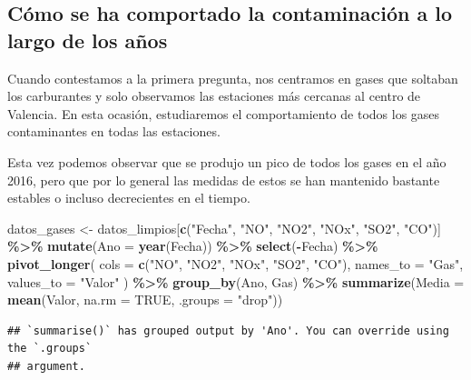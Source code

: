 \documentclass[notspecified,article,submit,moreauthors,pdftex]{Definitions/mdpi}
\newenvironment{Shaded}{\begin{snugshade}}{\end{snugshade}}
\newcommand{\AttributeTok}[1]{\textcolor[rgb]{0.13,0.29,0.53}{#1}}
\newcommand{\ConstantTok}[1]{\textcolor[rgb]{0.56,0.35,0.01}{#1}}
\newcommand{\FunctionTok}[1]{\textcolor[rgb]{0.13,0.29,0.53}{\textbf{#1}}}
\newcommand{\NormalTok}[1]{#1}
\newcommand{\OtherTok}[1]{\textcolor[rgb]{0.56,0.35,0.01}{#1}}
\newcommand{\SpecialCharTok}[1]{\textcolor[rgb]{0.81,0.36,0.00}{\textbf{#1}}}
\newcommand{\StringTok}[1]{\textcolor[rgb]{0.31,0.60,0.02}{#1}}
\begin{document}
\hypertarget{cuxf3mo-se-ha-comportado-la-contaminaciuxf3n-a-lo-largo-de-los-auxf1os}{%
\subsection{Cómo se ha comportado la contaminación a lo largo de los
años}\label{cuxf3mo-se-ha-comportado-la-contaminaciuxf3n-a-lo-largo-de-los-auxf1os}}

Cuando contestamos a la primera pregunta, nos centramos en gases que
soltaban los carburantes y solo observamos las estaciones más cercanas
al centro de Valencia. En esta ocasión, estudiaremos el comportamiento
de todos los gases contaminantes en todas las estaciones.

Esta vez podemos observar que se produjo un pico de todos los gases en
el año 2016, pero que por lo general las medidas de estos se han
mantenido bastante estables o incluso decrecientes en el tiempo.

\begin{Shaded}
\begin{Highlighting}[]
\NormalTok{datos\_gases }\OtherTok{\textless{}{-}}
\NormalTok{  datos\_limpios[}\FunctionTok{c}\NormalTok{(}\StringTok{"Fecha"}\NormalTok{, }\StringTok{"NO"}\NormalTok{, }\StringTok{"NO2"}\NormalTok{, }\StringTok{"NOx"}\NormalTok{, }\StringTok{"SO2"}\NormalTok{, }\StringTok{"CO"}\NormalTok{)] }\SpecialCharTok{\%\textgreater{}\%}
  \FunctionTok{mutate}\NormalTok{(}\AttributeTok{Ano =} \FunctionTok{year}\NormalTok{(Fecha)) }\SpecialCharTok{\%\textgreater{}\%}
  \FunctionTok{select}\NormalTok{(}\SpecialCharTok{{-}}\NormalTok{Fecha) }\SpecialCharTok{\%\textgreater{}\%}
  \FunctionTok{pivot\_longer}\NormalTok{(}
    \AttributeTok{cols =} \FunctionTok{c}\NormalTok{(}\StringTok{"NO"}\NormalTok{, }\StringTok{"NO2"}\NormalTok{, }\StringTok{"NOx"}\NormalTok{, }\StringTok{"SO2"}\NormalTok{, }\StringTok{"CO"}\NormalTok{),}
    \AttributeTok{names\_to =} \StringTok{"Gas"}\NormalTok{,}
    \AttributeTok{values\_to =} \StringTok{"Valor"}
\NormalTok{  ) }\SpecialCharTok{\%\textgreater{}\%}
  \FunctionTok{group\_by}\NormalTok{(Ano, Gas) }\SpecialCharTok{\%\textgreater{}\%}
  \FunctionTok{summarize}\NormalTok{(}\AttributeTok{Media =} \FunctionTok{mean}\NormalTok{(Valor, }\AttributeTok{na.rm =} \ConstantTok{TRUE}\NormalTok{, }\AttributeTok{.groups =} \StringTok{"drop"}\NormalTok{))}
\end{Highlighting}
\end{Shaded}

\begin{verbatim}
## `summarise()` has grouped output by 'Ano'. You can override using the `.groups`
## argument.
\end{verbatim}
\end{document}
